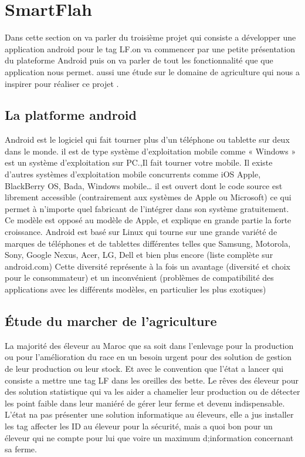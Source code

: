 \documentclass[11pt, a4paper, twoside]{book}
\begin{document}
\section{SmartFlah}
Dans cette section on va parler du troisième projet qui consiste a développer une application android pour le tag LF.on va commencer par une petite présentation du plateforme Android puis on va parler de tout les fonctionnalité que que application nous permet. aussi une étude sur le domaine de agriculture qui nous a inspirer pour réaliser ce projet .\\
\subsection{La platforme android}
Android est le logiciel qui fait tourner plus d’un téléphone ou tablette sur deux dans le monde.
il est de type système d’exploitation mobile comme « Windows » est un système d’exploitation sur PC.,Il fait tourner votre mobile. Il existe d’autres systèmes d’exploitation mobile concurrents comme iOS Apple, BlackBerry OS, Bada, Windows mobile… il est ouvert dont le code source est librement accessible (contrairement aux systèmes de Apple ou Microsoft) ce qui permet à n’importe quel fabricant de l’intégrer dans son système gratuitement. Ce modèle est opposé au modèle de Apple, et explique en grande partie la forte croissance. Android est basé sur Linux qui tourne sur une grande variété de marques de téléphones et de tablettes différentes telles que Samsung, Motorola, Sony, Google Nexus, Acer, LG, Dell et bien plus encore (liste complète sur android.com) Cette diversité représente à la fois un avantage (diversité et choix pour le consommateur) et un inconvénient (problèmes de compatibilité des applications avec les différents modèles, en particulier les plus exotiques)
\subsection{Étude du marcher de l'agriculture}
La majorité des éleveur au Maroc que sa soit dans l'enlevage pour la production ou pour l'amélioration du race en un besoin urgent pour des solution de gestion de leur production ou leur stock. Et avec le convention que l'état a lancer qui consiste a mettre une tag LF dans les oreilles des bette. Le rêves des éleveur pour des solution statistique qui va les aider a chamelier leur production ou de détecter les point faible dans leur maniéré de gérer leur ferme et devenu indispensable. L'état na pas présenter une solution informatique au éleveurs, elle a jus installer les tag affecter les ID au éleveur pour la sécurité, mais a quoi bon pour un éleveur qui ne compte pour lui que voire un maximum d;information concernant sa ferme.\\
\end{document}
